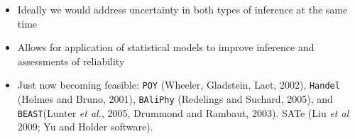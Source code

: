 \documentclass[landscape]{foils}
\begin{document}
\begin{itemize}
	\item Ideally we would address uncertainty in both types of inference at the same time
	\item Allows for application of statistical models to improve inference and assessments of reliability
	\item Just now becoming feasible: {\tt POY} (Wheeler, Gladstein, Laet, 2002), {\tt Handel} (Holmes and Bruno, 2001), {\tt BAliPhy} (Redelings and Suchard, 2005), and {\tt BEAST}(Lunter {\em et al.}, 2005, Drummond and Rambaut, 2003). SATe (Liu {\em et al} 2009; Yu and Holder software).
\end{itemize}

\myNewSlide

\end{document}
